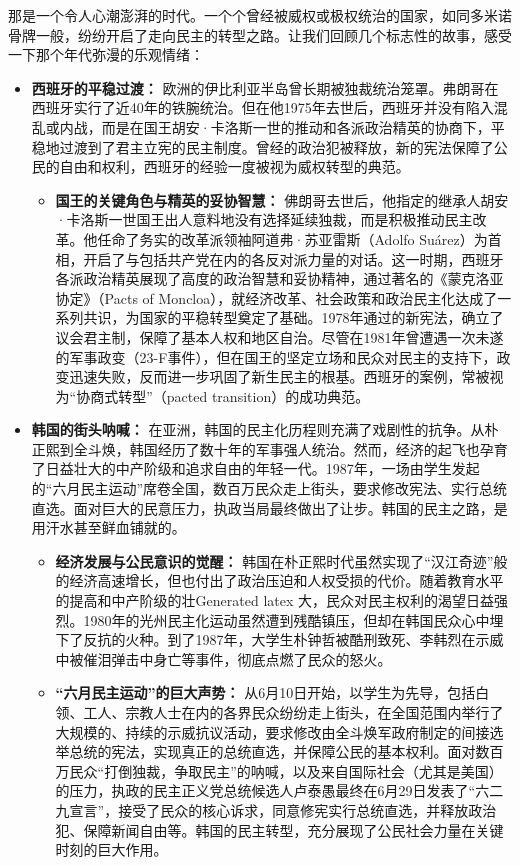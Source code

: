 \documentclass[UTF8, 10pt]{ctexbook}
\begin{document}
那是一个令人心潮澎湃的时代。一个个曾经被威权或极权统治的国家，如同多米诺骨牌一般，纷纷开启了走向民主的转型之路。让我们回顾几个标志性的故事，感受一下那个年代弥漫的乐观情绪：
\begin{itemize}
    \item \textbf{西班牙的平稳过渡：} 欧洲的伊比利亚半岛曾长期被独裁统治笼罩。弗朗哥在西班牙实行了近40年的铁腕统治。但在他1975年去世后，西班牙并没有陷入混乱或内战，而是在国王胡安·卡洛斯一世的推动和各派政治精英的协商下，平稳地过渡到了君主立宪的民主制度。曾经的政治犯被释放，新的宪法保障了公民的自由和权利，西班牙的经验一度被视为威权转型的典范。
    \begin{itemize}
        \item \textbf{国王的关键角色与精英的妥协智慧：} 佛朗哥去世后，他指定的继承人胡安·卡洛斯一世国王出人意料地没有选择延续独裁，而是积极推动民主改革。他任命了务实的改革派领袖阿道弗·苏亚雷斯（Adolfo Suárez）为首相，开启了与包括共产党在内的各反对派力量的对话。这一时期，西班牙各派政治精英展现了高度的政治智慧和妥协精神，通过著名的《蒙克洛亚协定》（Pacts of Moncloa），就经济改革、社会政策和政治民主化达成了一系列共识，为国家的平稳转型奠定了基础。1978年通过的新宪法，确立了议会君主制，保障了基本人权和地区自治。尽管在1981年曾遭遇一次未遂的军事政变（23-F事件），但在国王的坚定立场和民众对民主的支持下，政变迅速失败，反而进一步巩固了新生民主的根基。西班牙的案例，常被视为“协商式转型”（pacted transition）的成功典范。
    \end{itemize}
    \item \textbf{韩国的街头呐喊：} 在亚洲，韩国的民主化历程则充满了戏剧性的抗争。从朴正熙到全斗焕，韩国经历了数十年的军事强人统治。然而，经济的起飞也孕育了日益壮大的中产阶级和追求自由的年轻一代。1987年，一场由学生发起的“六月民主运动”席卷全国，数百万民众走上街头，要求修改宪法、实行总统直选。面对巨大的民意压力，执政当局最终做出了让步。韩国的民主之路，是用汗水甚至鲜血铺就的。
    \begin{itemize}
        \item \textbf{经济发展与公民意识的觉醒：} 韩国在朴正熙时代虽然实现了“汉江奇迹”般的经济高速增长，但也付出了政治压迫和人权受损的代价。随着教育水平的提高和中产阶级的壮Generated latex
大，民众对民主权利的渴望日益强烈。1980年的光州民主化运动虽然遭到残酷镇压，但却在韩国民众心中埋下了反抗的火种。到了1987年，大学生朴钟哲被酷刑致死、李韩烈在示威中被催泪弹击中身亡等事件，彻底点燃了民众的怒火。
        \item \textbf{“六月民主运动”的巨大声势：} 从6月10日开始，以学生为先导，包括白领、工人、宗教人士在内的各界民众纷纷走上街头，在全国范围内举行了大规模的、持续的示威抗议活动，要求修改由全斗焕军政府制定的间接选举总统的宪法，实现真正的总统直选，并保障公民的基本权利。面对数百万民众“打倒独裁，争取民主”的呐喊，以及来自国际社会（尤其是美国）的压力，执政的民主正义党总统候选人卢泰愚最终在6月29日发表了“六二九宣言”，接受了民众的核心诉求，同意修宪实行总统直选，并释放政治犯、保障新闻自由等。韩国的民主转型，充分展现了公民社会力量在关键时刻的巨大作用。

\end{itemize}
\end{itemize}
\end{document}
